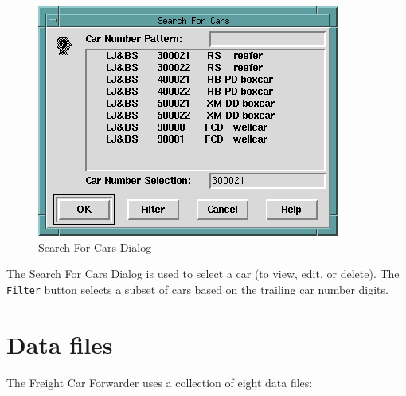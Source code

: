 \begin{figure}[hbpt]
\begin{centering}
\includegraphics{FCFSelectACarDialog.png}
\caption{Search For Cars Dialog}
\label{fig:fcf:searchcarsdialog}
\end{centering}
\end{figure}
The Search For Cars Dialog is used to select a car (to view, edit, or
delete). The \verb=Filter= button selects a  subset of cars based on the
trailing car number digits.

\section{Data files}
\label{sect:fcf:Files}

The Freight Car Forwarder uses a collection of eight data files:

